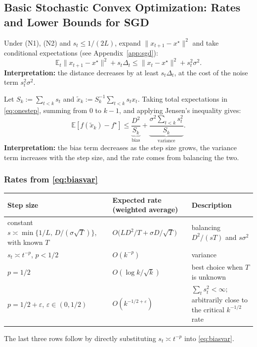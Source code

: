 \documentclass[11pt]{article}
\newcommand{\E}{\mathbb{E}}
\begin{document}
\subsection{Basic Stochastic Convex Optimization: Rates and Lower Bounds for SGD}

Under (N1), (N2) and $s_t\le 1/(2L)$, expand $\|x_{t+1}-x^\star\|^2$ and take conditional expectations (see Appendix~\ref{app:sgd}):
\begin{equation}
\E_t\|x_{t+1}-x^\star\|^2+s_t\Delta_t\le\|x_t-x^\star\|^2+s_t^2\sigma^2 .
\label{eq:onestep}
\end{equation}
\textbf{Interpretation:} the distance decreases by at least $s_t\Delta_t$, at the cost of the noise term $s_t^2\sigma^2$.

Let $S_k:=\sum_{t<k}s_t$ and $\widetilde x_k:=S_k^{-1}\sum_{t<k}s_tx_t$. Taking total expectations in \eqref{eq:onestep}, summing from $0$ to $k-1$, and applying Jensen’s inequality gives:
\begin{equation}
\boxed{\;
\E[f(\widetilde x_k)-f^\star]
\le
\underbrace{\frac{D^2}{S_k}}_{\text{bias}}
+\underbrace{\frac{\sigma^2\sum_{t<k}s_t^2}{S_k}}_{\text{variance}} .
\;}
\label{eq:biasvar}
\end{equation}
\textbf{Interpretation:} the bias term decreases as the step size grows, the variance term increases with the step size, and the rate comes from balancing the two.

\subsubsection{Rates from \texorpdfstring{\eqref{eq:biasvar}}{(2)}}

\begin{center}
\small
\begin{tabularx}{\linewidth}{@{}Yl Y@{}}
\toprule
Step size & Expected rate (weighted average) & Description \\
\midrule
constant $s\asymp\min\{1/L,\,D/(\sigma\sqrt T)\}$, with known $T$ & $O\bigl(LD^2/T+\sigma D/\sqrt T\bigr)$ & balancing $D^2/(sT)$ and $s\sigma^2$ \citep{nemirovski2009} \\
$s_t\asymp t^{-p}$, $p<1/2$ & $O(k^{-p})$ & variance \\
$p=1/2$ & $O(\log k/\sqrt k)$ & best choice when $T$ is unknown \\
$p=1/2+\varepsilon$, $\varepsilon\in(0,1/2)$ & $O(k^{-1/2+\varepsilon})$ & $\sum_t s_t^2<\infty$; arbitrarily close to the critical $k^{-1/2}$ rate \\
\bottomrule
\end{tabularx}
\end{center}
The last three rows follow by directly substituting $s_t\asymp t^{-p}$ into \eqref{eq:biasvar}.
\end{document}
